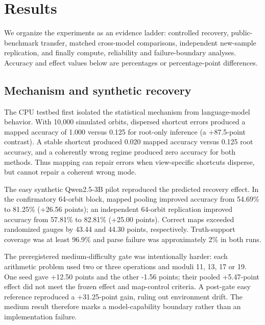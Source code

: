 \documentclass[11pt]{article}
\begin{document}
\section{Results}

We organize the experiments as an evidence ladder: controlled recovery, public-benchmark transfer, matched cross-model comparisons, independent new-sample replication, and finally compute, reliability and failure-boundary analyses. Accuracy and effect values below are percentages or percentage-point differences.

\subsection{Mechanism and synthetic recovery}

The CPU testbed first isolated the statistical mechanism from language-model behavior. With 10,000 simulated orbits, dispersed shortcut errors produced a mapped accuracy of 1.000 versus 0.125 for root-only inference (a +87.5-point contrast). A stable shortcut produced 0.020 mapped accuracy versus 0.125 root accuracy, and a coherently wrong regime produced zero accuracy for both methods. Thus mapping can repair errors when view-specific shortcuts disperse, but cannot repair a coherent wrong mode.

The easy synthetic Qwen2.5-3B pilot reproduced the predicted recovery effect. In the confirmatory 64-orbit block, mapped pooling improved accuracy from 54.69\% to 81.25\% (+26.56 points); an independent 64-orbit replication improved accuracy from 57.81\% to 82.81\% (+25.00 points). Correct maps exceeded randomized gauges by 43.44 and 44.30 points, respectively. Truth-support coverage was at least 96.9\% and parse failure was approximately 2\% in both runs.

The preregistered medium-difficulty gate was intentionally harder: each arithmetic problem used two or three operations and moduli 11, 13, 17 or 19. One seed gave +12.50 points and the other -1.56 points; their pooled +5.47-point effect did not meet the frozen effect and map-control criteria. A post-gate easy reference reproduced a +31.25-point gain, ruling out environment drift. The medium result therefore marks a model-capability boundary rather than an implementation failure.
\end{document}
